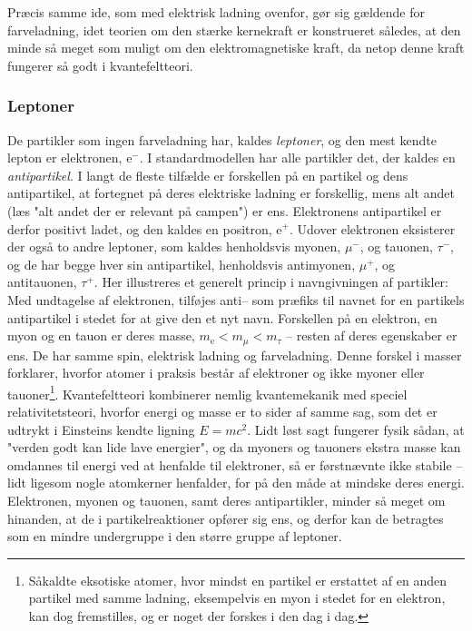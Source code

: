 Præcis samme ide, som med elektrisk ladning ovenfor, gør sig gældende for farveladning, idet teorien om den stærke kernekraft er konstrueret således, at den minde så meget som muligt om den elektromagnetiske kraft, da netop denne kraft fungerer så godt i kvantefeltteori.

\subsubsection{Leptoner} \label{sec:lepton}
De partikler som ingen farveladning har, kaldes \emph{leptoner}, og den mest kendte lepton er elektronen, $\mathrm{e}^-$. I standardmodellen har alle partikler det, der kaldes en \emph{antipartikel}. I langt de fleste tilfælde er forskellen på en partikel og dens antipartikel, at  fortegnet på deres elektriske ladning er forskellig, mens alt andet (læs "alt andet der er relevant på campen") er ens. Elektronens antipartikel er derfor positivt ladet, og den kaldes en positron, $\mathrm{e}^+$. Udover elektronen eksisterer der også to andre leptoner, som kaldes henholdsvis myonen, $\mu^-$, og tauonen, $\tau^-$, og de har begge hver sin antipartikel, henholdsvis antimyonen, $\mu^+$, og antitauonen, $\tau^+$. Her illustreres et generelt princip i navngivningen af partikler: Med undtagelse af elektronen,  tilføjes anti-- som præfiks til navnet for en partikels antipartikel i stedet for at give den et nyt navn. Forskellen på en elektron, en myon og en tauon er deres masse, $m_\text{e}<m_\mu<m_\tau$ -- resten af deres egenskaber er ens. De har samme spin, elektrisk ladning og farveladning. Denne forskel i masser forklarer, hvorfor atomer i praksis består af elektroner og ikke myoner eller tauoner\footnote{Såkaldte eksotiske atomer, hvor mindst en partikel er erstattet af en anden partikel med samme ladning, eksempelvis en myon i stedet for en elektron, kan dog fremstilles, og er noget der forskes i den dag i dag.}. Kvantefeltteori kombinerer nemlig kvantemekanik med speciel relativitetsteori, hvorfor energi og masse er to sider af samme sag, som det er udtrykt i Einsteins kendte ligning $E = mc^2$. Lidt løst sagt fungerer fysik sådan, at "verden godt kan lide lave energier", og da myoners og tauoners ekstra masse kan omdannes til energi ved at henfalde til elektroner, så er førstnævnte ikke stabile -- lidt ligesom nogle atomkerner henfalder, for på den måde at mindske deres energi. Elektronen, myonen og tauonen, samt deres antipartikler, minder så meget om hinanden, at de i partikelreaktioner opfører sig ens, og derfor kan de betragtes som en mindre undergruppe i den større gruppe af leptoner.\\

